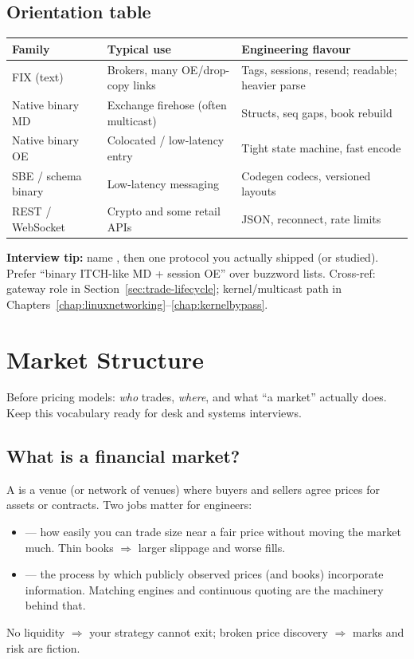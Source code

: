 \subsection{Orientation table}
\label{subsec:protocol-orientation-table}
\begin{center}
\small
\begin{tabular}{|l|p{3.6cm}|p{4.4cm}|}
\hline
\textbf{Family} & \textbf{Typical use} & \textbf{Engineering flavour} \\
\hline
FIX (text) & Brokers, many OE/drop-copy links & Tags, sessions, resend; readable; heavier parse \\
\hline
Native binary MD & Exchange firehose (often multicast) & Structs, seq gaps, book rebuild \\
\hline
Native binary OE & Colocated / low-latency entry & Tight state machine, fast encode \\
\hline
SBE / schema binary & Low-latency messaging & Codegen codecs, versioned layouts \\
\hline
REST / WebSocket & Crypto and some retail APIs & JSON, reconnect, rate limits \\
\hline
\end{tabular}
\end{center}

\par\noindent\textbf{Interview tip:} name , then one protocol 
you actually shipped (or studied). Prefer ``binary ITCH-like MD + session OE'' 
over buzzword lists. Cross-ref: gateway role in Section~\ref{sec:trade-lifecycle}; 
kernel/multicast path in Chapters~\ref{chap:linuxnetworking}--\ref{chap:kernelbypass}.

\section{Market Structure}
\label{sec:market-structure}
Before pricing models: \emph{who} trades, \emph{where}, and what ``a market'' 
actually does. Keep this vocabulary ready for desk and systems interviews.

\subsection{What is a financial market?}
\label{subsec:what-is-financial-market}
A  is a venue (or network of venues) where buyers and 
sellers agree prices for assets or contracts. Two jobs matter for engineers:
\begin{itemize}
    \item {} --- how easily you can trade size near a fair price 
          without moving the market much. Thin books $\Rightarrow$ larger slippage and 
          worse fills.
    \item {} --- the process by which publicly observed 
          prices (and books) incorporate information. Matching engines and continuous 
          quoting are the machinery behind that.
\end{itemize}
No liquidity $\Rightarrow$ your strategy cannot exit; broken price discovery $\Rightarrow$ 
marks and risk are fiction.

